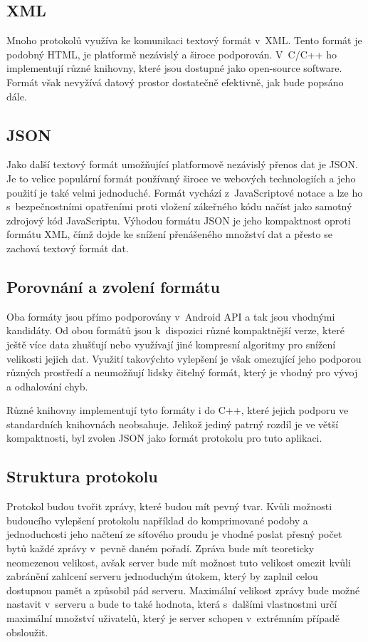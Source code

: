 \documentclass[thesis=B,czech]{FITthesis}[2013/10/20]
\begin{document}
\subsection{XML}

Mnoho protokolů využíva ke komunikaci textový formát v~XML. Tento formát je podobný HTML, je platformě nezávislý a široce podporován. V~C/C++ ho implementují různé knihovny, které jsou dostupné jako open-source software. Formát však nevyžívá datový prostor dostatečně efektivně, jak bude popsáno dále.

\subsection{JSON}

Jako další textový formát umožňující platformově nezávislý přenos dat je JSON. Je to velice populární formát používaný široce ve webových technologiích a jeho použití je také velmi jednoduché. Formát vychází z~JavaScriptové notace a lze ho s~bezpečnostními opatřeními proti vložení zákeřného kódu načíst jako samotný zdrojový kód JavaScriptu. Výhodou formátu JSON je jeho kompaktnost oproti formátu XML, čímž dojde ke snížení přenášeného množství dat a přesto se zachová textový formát dat.

\subsection{Porovnání a zvolení formátu}

Oba formáty jsou přímo podporovány v~Android API a tak jsou vhodnými kandidáty. Od obou formátů jsou k~dispozici různé kompaktnější verze, které ještě více data zhušťují nebo využívají jiné kompresní algoritmy pro snížení velikosti jejich dat. Využití takovýchto vylepšení je však omezující jeho podporou různých prostředí a neumožňují lidsky čitelný formát, který je vhodný pro vývoj a odhalování chyb.

Různé knihovny implementují tyto formáty i do C++, které jejich podporu ve standardních knihovnách neobsahuje. Jelikož jediný patrný rozdíl je ve větší kompaktnosti, byl zvolen JSON jako formát protokolu pro tuto aplikaci.

\subsection{Struktura protokolu}

Protokol budou tvořit zprávy, které budou mít pevný tvar. Kvůli možnosti budoucího vylepšení protokolu například do komprimované podoby a jednoduchosti jeho načtení ze síťového proudu je vhodné poslat přesný počet bytů každé zprávy v~pevně daném pořadí. Zpráva bude mít teoreticky neomezenou velikost, avšak server bude mít možnost tuto velikost omezit kvůli zabránění zahlcení serveru jednoduchým útokem, který by zaplnil celou dostupnou pamět a způsobil pád serveru. Maximální velikost zprávy bude možné nastavit v~serveru a bude to také hodnota, která s~dalšími vlastnostmi určí maximální množství uživatelů, který je server schopen v~extrémním případě obsloužit.
\end{document}
